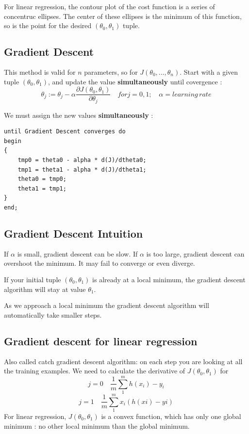 \documentclass[a4paper]{article}
\begin{document}
For linear regression, the contour plot of the cost function is a series of concentruc ellipses. The center of these ellipses is the minimum of this function, so is the point for the desired $(\theta_0, \theta_1)$ tuple.

\subsection{Gradient Descent}

This method is valid for $n$ parameters, so for $J(\theta_0, \ldots ,\theta_n)$.
Start with a given tuple $(\theta_0, \theta_1)$, and update the value \textbf{simultaneously} until covergence :
$$\theta_j := \theta_j - \alpha \frac{\partial J(\theta_0,\theta_1)}{\partial \theta_j}   \quad for j=0,1;\quad \alpha = learning \, rate $$

We must assign the new values \textbf{simultaneously} : 
\begin{lstlisting}[frame=single]
until Gradient Descent converges do
begin
{ 
    tmp0 = theta0 - alpha * d(J)/dtheta0;
    tmp1 = theta1 - alpha * d(J)/dtheta1;
    theta0 = tmp0;
    theta1 = tmp1;
}
end;
\end{lstlisting}

\subsection{Gradient Descent Intuition}

If $\alpha$ is small, gradient descent can be slow. If $\alpha$ is too large, gradient descent can overshoot the minimum. It may fail to converge or even diverge. 

If your initial tuple $(\theta_0, \theta_1)$ is already at a local minimum, the gradient descent algorithm will stay at value $\theta_1$. 

As we approach a local minimum the gradient descent algorithm will automatically take smaller steps.

\subsection{Gradient descent for linear regression}
 Also called catch gradient descent algorithm: on each step you are looking at all the training examples. We need to calculate the derivative of $J(\theta_0,\theta_1)$ for 
$$j = 0 \quad \frac{1}{m} \sum_{1}^{m} h(x_i)-y_i $$ 
$$j = 1 \quad \frac{1}{m} \sum_{1}^{m} x_i(h(xi)-yi)$$ 
For linear regression, $J(\theta_0,\theta_1)$ is a convex function, which has only one global minimum : no other local minimum than the global minimum.
\end{document}
